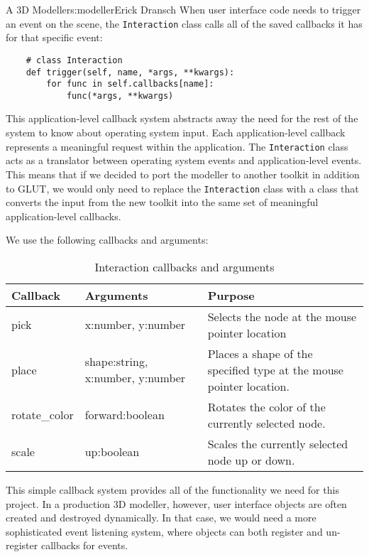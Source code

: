 \begin{aosachapter}{A 3D Modeller}{s:modeller}{Erick Dransch}
When user interface code needs to trigger an event on the scene, the
\texttt{Interaction} class calls all of the saved callbacks it has for
that specific event:

\begin{verbatim}
    # class Interaction
    def trigger(self, name, *args, **kwargs):
        for func in self.callbacks[name]:
            func(*args, **kwargs)
\end{verbatim}

This application-level callback system abstracts away the need for the
rest of the system to know about operating system input. Each
application-level callback represents a meaningful request within the
application. The \texttt{Interaction} class acts as a translator between
operating system events and application-level events. This means that if
we decided to port the modeller to another toolkit in addition to GLUT,
we would only need to replace the \texttt{Interaction} class with a
class that converts the input from the new toolkit into the same set of
meaningful application-level callbacks.

We use the following callbacks and arguments:

\begin{table}
\centering
{\footnotesize
{}
\begin{tabular}{lll}
\hline
\textbf{Callback}
& \textbf{Arguments}
& \textbf{Purpose}
\\
\hline
pick    
& x:number, y:number 
& Selects the node at the mouse pointer location
\\
place & 
shape:string, x:number, y:number & 
Places a shape of the specified type at the mouse pointer location.
\\
rotate\_color & 
forward:boolean & 
Rotates the color of the currently selected node.
\\
scale & 
up:boolean & 
Scales the currently selected node up or down.
\\
\hline
\end{tabular}
}
\caption{Interaction callbacks and arguments}
\label{500l.tbl.callbacks}
\end{table}

This simple callback system provides all of the functionality we need
for this project. In a production 3D modeller, however, user interface
objects are often created and destroyed dynamically. In that case, we
would need a more sophisticated event listening system, where objects
can both register and un-register callbacks for events.


\end{aosachapter}

